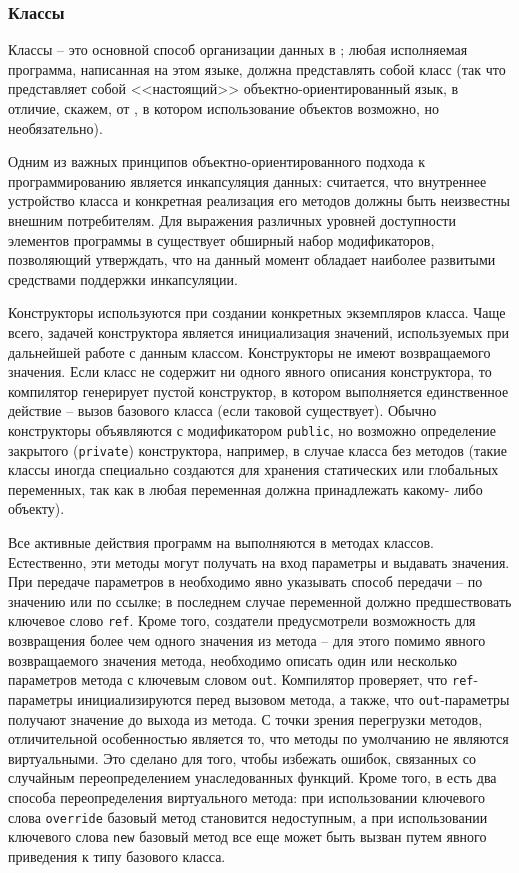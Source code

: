 \subsubsection{Классы}

Классы -- это основной способ организации данных в \CSharp; любая исполняемая программа, написанная на этом языке, должна представлять собой класс (так что \CSharp представляет собой <<настоящий>> объектно-ориенти\-рованный язык, в отличие, скажем, от \CPP, в котором использование объектов возможно, но необязательно).

Одним из важных принципов объектно-ориентированного подхода к программированию является инкапсуляция данных: считается, что внутреннее устройство класса и конкретная реализация его методов должны быть неизвестны внешним потребителям. Для выражения различных уровней доступности элементов программы в \CSharp существует обширный набор модификаторов, позволяющий утверждать, что на данный момент \CSharp обладает наиболее развитыми средствами поддержки инкапсуляции.

Конструкторы используются при создании конкретных экземпляров класса. Чаще всего, задачей конструктора является инициализация значений, используемых при дальнейшей работе с данным классом. Конструкторы не имеют возвращаемого значения. Если класс не содержит ни одного явного описания конструктора, то компилятор генерирует пустой конструктор, в котором выполняется единственное действие -- вызов базового класса (если таковой существует). Обычно конструкторы объявляются с модификатором \lstinline{public}, но возможно определение закрытого (\lstinline{private}) конструктора, например, в случае класса без методов (такие классы иногда специально создаются для хранения статических или глобальных переменных, так как в \CSharp любая переменная должна принадлежать какому- либо объекту).

Все активные действия программ на \CSharp выполняются в методах классов. Естественно, эти методы могут получать на вход параметры и выдавать значения. При передаче параметров в \CSharp необходимо явно указывать способ передачи -- по значению или по ссылке; в последнем случае переменной должно предшествовать ключевое слово \lstinline{ref}. Кроме того, создатели \CSharp предусмотрели возможность для возвращения более чем одного значения из метода – для этого помимо явного возвращаемого значения метода, необходимо описать один или несколько параметров метода с ключевым словом \lstinline{out}. Компилятор \CSharp проверяет, что \lstinline{ref}-параметры инициализируются перед вызовом метода, а также, что \lstinline{out}-параметры получают значение до выхода из метода. С точки зрения перегрузки методов, отличительной особенностью \CSharp является то, что методы по умолчанию не являются виртуальными. Это сделано для того, чтобы избежать ошибок, связанных со случайным переопределением унаследованных функций. Кроме того, в \CSharp есть два способа переопределения виртуального метода: при использовании ключевого слова \lstinline{override} базовый метод становится недоступным, а при использовании ключевого слова \lstinline{new} базовый метод все еще может быть вызван путем явного приведения к типу базового класса.

